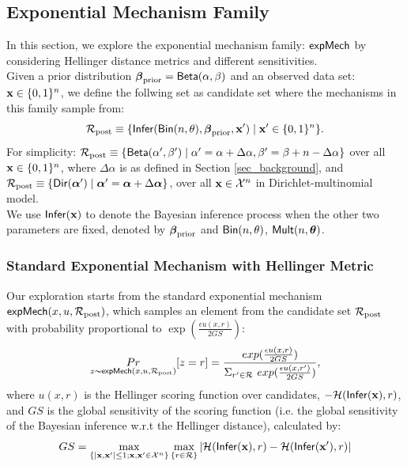 \documentclass{article}
\begin{document}
\subsection{Exponential Mechanism Family}
In this section, we explore the exponential mechanism family: $\mathsf{expMech}$ by considering Hellinger distance metrics and different sensitivities.\\
Given a prior distribution $\boldsymbol{\beta}_{\textup{prior}}=\mathsf{Beta}(\alpha, \beta)$ and an observed data set: $\textbf{x}\in\{0,1\}^n$, we define the follwing set as candidate set where the mechanisms in this family sample from:
\[
  \mathcal{R}_{\textup{post}}\equiv\{\mathsf{Infer}(\mathsf{Bin}(n, \theta), \boldsymbol{\beta}_{\textup{prior}},\textbf{x}')\mid \textbf{x}' \in \{0,1\}^n\}.
\]
For simplicity:
$
  \mathcal{R}_{\textup{post}}\equiv\{\mathsf{Beta}(\alpha',\beta')\mid \alpha'=\alpha + \Delta\alpha, \beta'=\beta + n-\Delta\alpha\}
$
over all $\textbf{x} \in \{0,1\}^n$, where $\Delta\alpha$ is as defined in Section \ref{sec_background}, and
$
  \mathcal{R}_{\textup{post}}\equiv\{\mathsf{Dir}(\boldsymbol{\alpha}') \mid \boldsymbol{\alpha}'=\boldsymbol{\alpha} + \Delta\boldsymbol{\alpha}\}
$,
over all $\textbf{x} \in \mathcal{X}^n$ in Dirichlet-multinomial model.\\
We use $\mathsf{Infer}(\textbf{x})$ to denote the Bayesian inference process when the other two parameters are fixed, denoted by $\boldsymbol{\beta}_{\textup{prior}}$ and $\mathsf{Bin}(n, \theta)$, $\mathsf{Mult}(n, \boldsymbol{\theta})$. 

\subsubsection{Standard Exponential Mechanism with Hellinger Metric}
Our exploration starts from the standard exponential mechanism $\mathsf{expMech}(x,u,\mathcal{R}_{\textup{post}})$, which samples an element from the candidate set $\mathcal{R}_{\textup{post}}$ with probability proportional to $\exp(\frac{\epsilon u(x,r)}{2 GS})$:
\[
\underset{z \thicksim \mathsf{expMech}(x,u,\mathcal{R}_{\textup{post}}) }{Pr}[z=r] = \frac
{exp(\frac{\epsilon u(x,r)}{2 GS})}
{\Sigma_{r' \in \mathcal{R}}\ exp(\frac{\epsilon u(x,r')}{2 GS})},
\]
where $u(x,r)$ is the Hellinger scoring function over candidates, $-\mathcal{H}(\mathsf{Infer}(\textbf{x}), r)$, and $GS$ is the global sensitivity of the scoring function (i.e. the global sensitivity of the Bayesian inference w.r.t the Hellinger distance), calculated by:
\begin{equation*}
GS = 
\max_{\{|\textbf{x},\textbf{x}'| \leq 1;\textbf{x},\textbf{x}'\in \mathcal{X}^n\}}\max_{\{r\in \mathcal{R}\}}
|\mathcal{H}(\mathsf{Infer}(\textbf{x}), r) - \mathcal{H}(\mathsf{Infer}(\textbf{x}'), r)|
\end{equation*}
\end{document}
